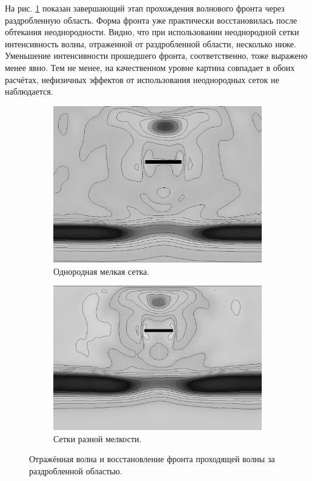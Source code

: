 На рис. \ref{pic:crack_final_front} показан завершающий этап прохождения волнового фронта через раздробленную область. Форма фронта уже практически восстановилась после обтекания неоднородности. Видно, что при использовании неоднородной сетки интенсивность волны, отраженной от раздробленной области, несколько ниже. Уменьшение интенсивности прошедшего фронта, соответственно, тоже выражено менее явно. Тем не менее, на качественном уровне картина совпадает в обоих расчётах, нефизичных эффектов от использования неоднородных сеток не наблюдается.

\begin{figure}[htp]
\begin{subfigure}[b]{0.5\textwidth}
\centering
\includegraphics[width=\textwidth]{png/wave-around-crack/final-front-uniform-mesh.png}
\caption{Однородная мелкая сетка.}
\end{subfigure}
\begin{subfigure}[b]{0.5\textwidth}
\centering
\includegraphics[width=\textwidth]{png/wave-around-crack/final-front-non-uniform-mesh.png}
\caption{Сетки разной мелкости.}
\end{subfigure}
\caption{Отражённая волна и восстановление фронта проходящей волны за раздробленной областью.}
\label{pic:crack_final_front}
\end{figure}

